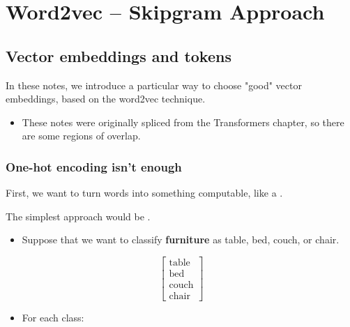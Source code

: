 \chapter{Word2vec -- Skipgram Approach}

\section{Vector embeddings and tokens}

    In these notes, we introduce a particular way to choose "good" vector embeddings, based on the word2vec technique.

    \begin{itemize}
        \item These notes were originally spliced from the Transformers chapter, so there are some regions of overlap.
    \end{itemize}


    \subsection{One-hot encoding isn't enough}

        First, we want to turn words into something computable, like a .
    
        The simplest approach would be .
            
        \begin{itemize}
            \item \miniex Suppose that we want to classify \textbf{furniture} as table, bed, couch, or chair.
        \end{itemize}
        
        \begin{equation}
            \begin{bmatrix}
              \text{table} \\ \text{bed} \\ \text{couch} \\ \text{chair} 
            \end{bmatrix}
        \end{equation}

        \begin{itemize}
            \item For each class:
        \end{itemize}
        
